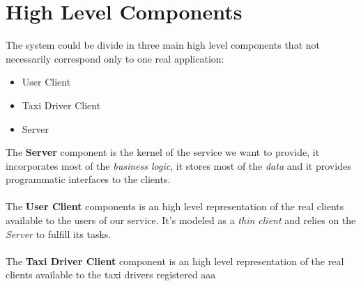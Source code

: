 \section{High Level Components} %
\label{sec:high_level_components}
The system could be divide in three main high level components that not necessarily correspond only to one real application:
\begin{itemize}
	\item User Client
	\item Taxi Driver Client
	\item Server
\end{itemize}
The \textbf{Server} component is the kernel of the service we want to provide, it incorporates most of the \emph{business logic}, it stores most of the \emph{data} and it provides programmatic interfaces to the clients.\\\\
The \textbf{User Client} components is an high level representation of the real clients available to the users of our service. It's modeled as a \emph{thin client} and relies on the \emph{Server} to fulfill its tasks.\\\\
The \textbf{Taxi Driver Client} component is an high level representation of the real clients available to the taxi drivers registered aaa
